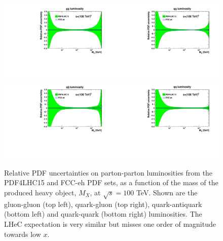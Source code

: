 \begin{figure}[t]
\centering
\includegraphics[width=0.5\textwidth]{Strong-Interaction/frac_gg_vs_mx_log.pdf}\includegraphics[width=0.5\textwidth]{Strong-Interaction/frac_gq_vs_mx_log.pdf}\\
\includegraphics[width=0.5\textwidth]{Strong-Interaction/frac_qqbar_vs_mx_log.pdf}\includegraphics[width=0.5\textwidth]{Strong-Interaction/frac_qq_vs_mx_log.pdf}
\caption{{Relative PDF uncertainties on parton-parton luminosities from
the PDF4LHC15
and FCC-eh PDF sets, as a function of the mass of the produced heavy
object, $M_X$,
at $\sqrt{s} = 100$ TeV. Shown are the gluon-gluon (top left),
quark-gluon (top right), quark-antiquark (bottom left) and quark-quark
(bottom right) luminosities. The LHeC expectation is very similar but
misses one order of magnitude towards low $x$.}}
\label{figlumisep}
\end{figure}

